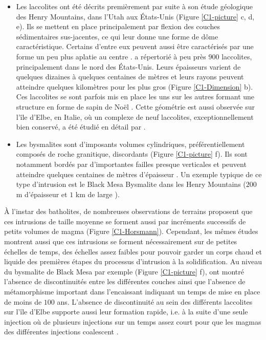 \begin{itemize}
\item   Les    laccolites   ont    été   décrits    premièrement   par
  \citet{Gilbert:1877uk}  suite  à  son  étude  géologique  des  Henry
  Mountains, dans l'Utah aux États-Unis (Figure \ref{C1-picture} c, d,
  e).  Ils se mettent en  place principalement par flexion des couches
  sédimentaires  sus-jacentes, ce  qui leur  donne une  forme de  dôme
  caractéristique.    Certains   d'entre   eux  peuvent   aussi   être
  caractérisés  par   une  forme  un   peu  plus  aplatie   au  centre
  \citep{Koch:1981if}. \citet{E:2015tl} a répertorié  à peu près $900$
  laccolites,  principalement  dans  le nord  des  États-Unis.   Leurs
  épaisseurs  varient de  quelques  dizaines à  quelques centaines  de
  mètres et  leurs rayons  peuvent atteindre quelques  kilomètres pour
  les plus gros (Figure \ref{C1-Dimension} b).  Ces laccolites se sont
  parfois mis en place les uns sur les autres formant une structure en
  forme de sapin de Noël  \citep{E:2015tl}.  Cette géométrie est aussi
  observée  sur  l'île d'Elbe,  en  Italie,  où  un complexe  de  neuf
  laccolites, exceptionnellement bien conservé, a été étudié en détail
  par \citet{Rocchi:2002jy}.

\item   Les   bysmalites   sont  d'imposants   volumes   cylindriques,
  préférentiellement composés de roche granitique, discordants (Figure
  \ref{C1-picture} f).   Ils sont  notamment bordés  par d'importantes
  failles presque  verticales et peuvent atteindre  quelques centaines
  de mètres d'épaisseur \citep{Johnson:1973ho}.  Un exemple typique de
  ce  type d'intrusion  est le  Black  Mesa Bysmalite  dans les  Henry
  Mountains   ($200$    m   d'épaisseur    et   $1$   km    de   large
  \citep{Morgan:2008hj}).
\end{itemize}

À  l'instar des  batholites,  de nombreuses  observations de  terrains
proposent que  ces intrusions de  taille moyenne se forment  aussi par
incréments     successifs    de     petits     volumes    de     magma
\citep{Habert:2004wg,Horsman:2005ct,Morgan:2008hj}             (Figure
\ref{C1-Horsmann}).  Cependant,  les mêmes  études montrent  aussi que
ces intrusions  se forment nécessairement  sur de petites  échelles de
temps, des échelles  assez faibles pour pouvoir garder  un corps chaud
et  liquide  des  premières  étapes  du  processus  d'intrusion  à  la
solidification.   Au niveau  du bysmalite  de Black  Mesa par  exemple
(Figure   \ref{C1-picture}   f),  \citet{Habert:2004wg}   ont   montré
l'absence de  discontinuités entre  les différentes couches  ainsi que
l'absence de  métamorphisme important  dans l'encaissant  indiquant un
temps  de  mise  en  place  de  moins  de  $100$  ans.   L'absence  de
discontinuité  au  sein des  différents  laccolites  sur l'île  d'Elbe
supporte aussi  leur formation  rapide, i.e.  à  la suite  d'une seule
injection où de plusieurs injections sur un temps assez court pour que
les magmas des différentes injections coalescent \citep{Roni:2014gt}.

